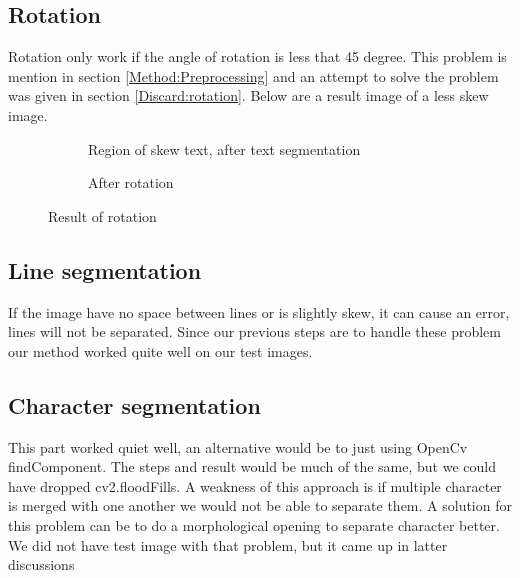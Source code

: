 \documentclass[Report.tex]{subfiles}
\begin{document}
\subsection{Rotation}
Rotation only work if the angle of rotation is less that 45 degree. This problem is mention in section \ref{Method:Preprocessing} and an attempt to solve the problem was given in section \ref{Discard:rotation}. Below are a result image of a less skew image.

\begin{figure}[ht]
  \centering
  \begin{subfigure}[t]{6cm}
    \caption{Region of skew text, after text segmentation}
  \end{subfigure}
  \hspace{2cm}%
  \begin{subfigure}[t]{6cm}
    \caption{After rotation}
  \end{subfigure}

  \caption{Result of rotation}
  \label{fig:result:rotation}
\end{figure}

\subsection{Line segmentation}
If the image have no space between lines or is slightly skew, it can cause an error, lines will not be separated. Since our previous steps are to handle these problem our method worked quite well on our test images.


\subsection{Character segmentation}
This part worked quiet well, an alternative would be to just using OpenCv findComponent. The steps and result would be much of the same, but we could have dropped cv2.floodFills. A weakness of this approach is if multiple character is merged with one another we would not be able to separate them. A solution for this problem can be to do a morphological opening to separate character better. We did not have test image with that problem, but it came up in latter discussions
\end{document}
